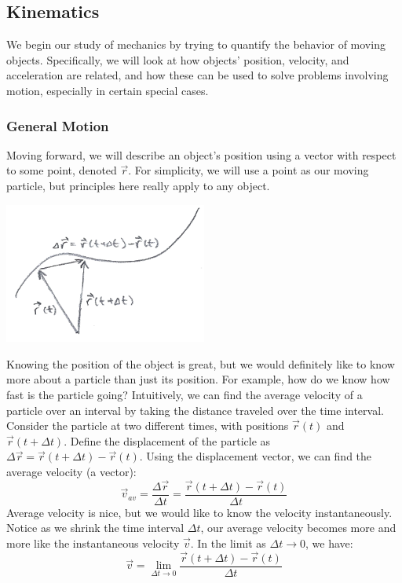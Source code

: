 \subsection{Kinematics}
We begin our study of mechanics by trying to quantify the behavior of moving objects. Specifically, we will look at how objects' position, velocity, and acceleration are related, and how these can be used to solve problems involving motion, especially in certain special cases. 
\subsubsection{General Motion}
Moving forward, we will describe an object's position using a vector with respect to some point, denoted $\vec{r}$. For simplicity, we will use a point as our moving particle, but principles here really apply to any object. \\
\begin{center}
	\includegraphics[width=0.5\textwidth]{images/mechintro/general_motion.png}\\
\end{center}
Knowing the position of the object is great, but we would definitely like to know more about a particle than just its position. For example, how do we know how fast is the particle going? Intuitively, we can find the average velocity of a particle over an interval by taking the distance traveled over the time interval. Consider the particle at two different times, with positions $\vec{r}(t)$ and $\vec{r}(t + \Delta t)$. Define the displacement of the particle as $\Delta\vec{r} = \vec{r}(t + \Delta t) - \vec{r}(t)$. Using the displacement vector, we can find the average velocity (a vector): 
\[
	\vec{v}_{av} = \frac{\Delta \vec{r}}{\Delta t} = \frac{\vec{r}(t + \Delta t) - \vec{r}(t)}{\Delta t}
\]
Average velocity is nice, but we would like to know the velocity instantaneously. Notice as we shrink the time interval $\Delta t$, our average velocity becomes more and more like the instantaneous velocity $\vec{v}$. In the limit as $\Delta t \rightarrow 0$, we have:
\[
	\vec{v} = \lim_{\Delta t \rightarrow 0} \frac{\vec{r}(t + \Delta t) - \vec{r}(t)}{\Delta t}
\]

